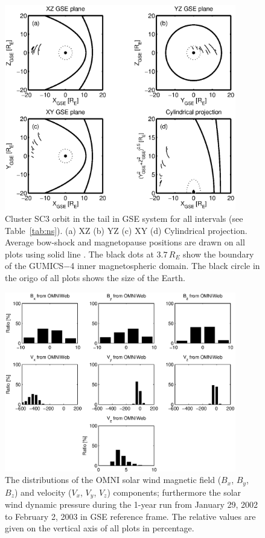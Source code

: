 \documentclass[linenumbers,draft]{agujournal}
\begin{document}
\begin{figure}[h]
\centering
\includegraphics[width=0.9\textwidth,angle=0]{swe-2020-corr-f12.eps}  
\caption{Cluster SC3 orbit in the tail in GSE system for all intervals (see Table~\ref{tab:ns}). (a) XZ (b) YZ (c) XY (d) Cylindrical projection. Average bow-shock and magnetopause positions are drawn on all plots using solid line \citep[][respectively]{peredo95:_three_alfven_mach,tsyganenko95:_model_earth}. The black dots at $3.7\,R_E$ show the boundary of the GUMICS$-$4 inner magnetospheric domain. The black circle in the origo of all plots shows the size of the Earth.}
\label{fig:nsorbit}
\end{figure}

\pagebreak

\begin{figure}[h]
\centering
\includegraphics[width=0.9\textwidth,angle=0]{swe-2020-corr-f13.eps}  
\caption{The distributions of the OMNI solar wind magnetic field ($B_{x}$, $B_{y}$, $B_{z}$) and velocity ($V_{x}$, $V_{y}$, $V_{z}$) components; furthermore the solar wind dynamic pressure during the 1-year run from January 29, 2002 to February 2, 2003 in GSE reference frame. The relative values are given on the vertical axis of all plots in percentage.}
\label{fig:omnidist}
\end{figure}
\end{document}
